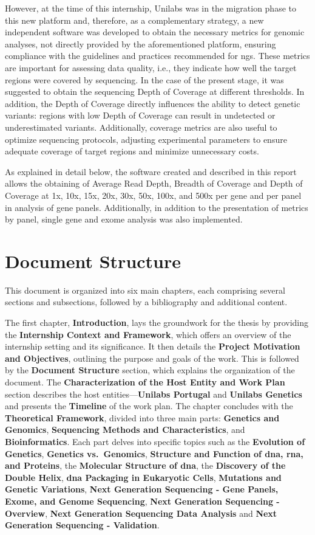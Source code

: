 However, at the time of this internship, Unilabs was in the migration phase to this new platform and, therefore, as a complementary strategy, a new independent software was developed to obtain the necessary metrics for genomic analyses, not directly provided by the aforementioned platform, ensuring compliance with the guidelines and practices recommended for \ac{ngs}. These metrics are important for assessing data quality, i.e., they indicate how well the target regions were covered by sequencing. In the case of the present stage, it was suggested to obtain the sequencing Depth of Coverage at different thresholds. In addition, the Depth of Coverage directly influences the ability to detect genetic variants: regions with low Depth of Coverage can result in undetected or underestimated variants. Additionally, coverage metrics are also useful to optimize sequencing protocols, adjusting experimental parameters to ensure adequate coverage of target regions and minimize unnecessary costs. 

As explained in detail below, the software created and described in this report allows the obtaining of Average Read Depth, Breadth of Coverage and Depth of Coverage at 1x, 10x, 15x, 20x, 30x, 50x, 100x, and 500x per gene and per panel in analysis of gene panels. Additionally, in addition to the presentation of metrics by panel, single gene and exome analysis was also implemented.

\section{Document Structure} \label{sec:doc_structure}

This document is organized into six main chapters, each comprising several sections and subsections, followed by a bibliography and additional content.

The first chapter, \textbf{Introduction}, lays the groundwork for the thesis by providing the \textbf{Internship Context and Framework}, which offers an overview of the internship setting and its significance. It then details the \textbf{Project Motivation and Objectives}, outlining the purpose and goals of the work. This is followed by the \textbf{Document Structure} section, which explains the organization of the document. The \textbf{Characterization of the Host Entity and Work Plan} section describes the host entities—\textbf{Unilabs Portugal} and \textbf{Unilabs Genetics} and presents the \textbf{Timeline} of the work plan. The chapter concludes with the \textbf{Theoretical Framework}, divided into three main parts: \textbf{Genetics and Genomics}, \textbf{Sequencing Methods and Characteristics}, and \textbf{Bioinformatics}. Each part delves into specific topics such as the \textbf{Evolution of Genetics}, \textbf{Genetics vs.\ Genomics}, \textbf{Structure and Function of \ac{dna}, \ac{rna}, and Proteins}, the \textbf{Molecular Structure of \ac{dna}}, the \textbf{Discovery of the Double Helix}, \textbf{\ac{dna} Packaging in Eukaryotic Cells}, \textbf{Mutations and Genetic Variations}, \textbf{Next Generation Sequencing - Gene Panels, Exome, and Genome Sequencing}, \textbf{Next Generation Sequencing - Overview}, \textbf{Next Generation Sequencing Data Analysis} and \textbf{Next Generation Sequencing - Validation}.

